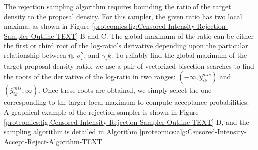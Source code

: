 The rejection sampling algorithm requires bounding the ratio of the target density to the proposal density.
For this sampler, the given ratio has two local maxima, as shown in Figure \ref{proteomics:fig:Censored-Intensity-Rejection-Sampler-Outline-TEXT} B and C.
The global maximum of the ratio can be either the first or third root of the log-ratio's derivative depending upon the particular relationship between $\bm \eta$, $\sigma^2_i$, and $\gamma_ik$.
To reliably find the global maximum of the target-proposal density ratio, we use a pair of vectorized bisection searches to find the roots of the derivative of the log-ratio in two ranges: $(-\infty,\hat{y}_{ik}^{mis})$ and $(\hat{y}_{ik}^{mis},\infty)$.
Once these roots are obtained, we simply select the one corresponding to the larger local maximum to compute acceptance probabilities.
A graphical example of the rejection sampler is shown in Figure \ref{proteomics:fig:Censored-Intensity-Rejection-Sampler-Outline-TEXT} D, and the sampling algorithm is detailed in Algorithm \ref{proteomics:alg:Censored-Intensity-Accept-Reject-Algorithm-TEXT}.


